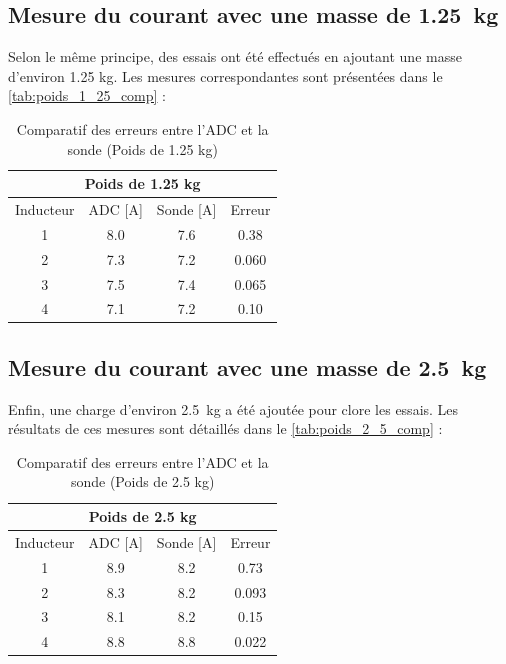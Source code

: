 \subsection{Mesure du courant avec une masse de 1.25~kg}
Selon le même principe, des essais ont été effectués en ajoutant une masse d'environ 1.25 kg. Les mesures correspondantes sont présentées dans le \autoref{tab:poids_1_25_comp} :

\begin{table}[H]
    \centering
    \begin{tabular}{|c|c|c|c|}
        \hline
        \multicolumn{4}{|c|}{\textbf{Poids de 1.25 kg}}  \\ \hline
        Inducteur & ADC {[}A{]} & Sonde {[}A{]} & Erreur \\ \hline
        1         & 8.0         & 7.6           & 0.38   \\ \hline
        2         & 7.3         & 7.2           & 0.060  \\ \hline
        3         & 7.5         & 7.4           & 0.065  \\ \hline
        4         & 7.1         & 7.2           & 0.10   \\ \hline
    \end{tabular}
    \caption{Comparatif des erreurs entre l'ADC et la sonde (Poids de 1.25 kg)}
    \label{tab:poids_1_25_comp}
\end{table}

\subsection{Mesure du courant avec une masse de 2.5~kg}
Enfin, une charge d'environ 2.5~kg a été ajoutée pour clore les essais. Les résultats de ces mesures sont détaillés dans le \autoref{tab:poids_2_5_comp} :

\begin{table}[H]
    \centering
    \begin{tabular}{|c|c|c|c|}
        \hline
        \multicolumn{4}{|c|}{\textbf{Poids de 2.5 kg}}   \\ \hline
        Inducteur & ADC {[}A{]} & Sonde {[}A{]} & Erreur \\ \hline
        1         & 8.9         & 8.2           & 0.73   \\ \hline
        2         & 8.3         & 8.2           & 0.093  \\ \hline
        3         & 8.1         & 8.2           & 0.15   \\ \hline
        4         & 8.8         & 8.8           & 0.022  \\ \hline
    \end{tabular}
    \caption{Comparatif des erreurs entre l'ADC et la sonde (Poids de 2.5 kg)}
    \label{tab:poids_2_5_comp}
\end{table}

